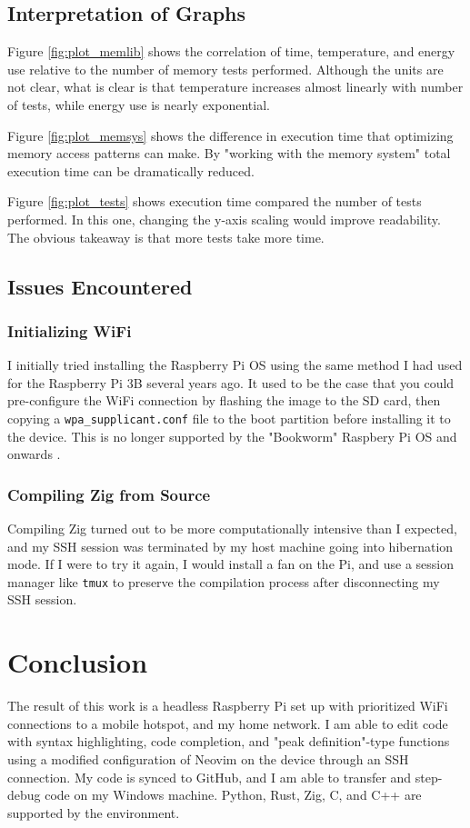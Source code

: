 \documentclass[12pt]{article}
\begin{document}
\subsection{Interpretation of Graphs}
Figure \ref{fig:plot_memlib} shows the correlation of time, temperature, and energy use relative to the number of memory tests performed. Although the units are not clear, what is clear is that temperature increases almost linearly with number of tests, while energy use is nearly exponential.

Figure \ref{fig:plot_memsys} shows the difference in execution time that optimizing memory access patterns can make. By "working with the memory system" total execution time can be dramatically reduced. 

Figure \ref{fig:plot_tests} shows execution time compared the number of tests performed. In this one, changing the y-axis scaling would improve readability. The obvious takeaway is that more tests take more time. 

\subsection{Issues Encountered}
\subsubsection{Initializing WiFi}
I initially tried installing the Raspberry Pi OS using the same method I had used for the Raspberry Pi 3B several years ago. It used to be the case that you could pre-configure the WiFi connection by flashing the image to the SD card, then copying a \verb|wpa_supplicant.conf| file to the boot partition before installing it to the device. This is no longer supported by the "Bookworm" Raspbery Pi OS and onwards \cite{raspberrypi_config}. 

\subsubsection{Compiling Zig from Source}
Compiling Zig turned out to be more computationally intensive than I expected, and my SSH session was terminated by my host machine going into hibernation mode. If I were to try it again, I would install a fan on the Pi, and use a session manager like \verb|tmux| to preserve the compilation process after disconnecting my SSH session.

\section{Conclusion}\label{sec:conclusion}
The result of this work is a headless Raspberry Pi set up with prioritized WiFi connections to a mobile hotspot, and my home network. I am able to edit code with syntax highlighting, code completion, and "peak definition"-type functions using a modified configuration of Neovim on the device through an SSH connection. My code is synced to GitHub, and I am able to transfer and step-debug code on my Windows machine. Python, Rust, Zig, C, and C++ are supported by the environment.
\end{document}
